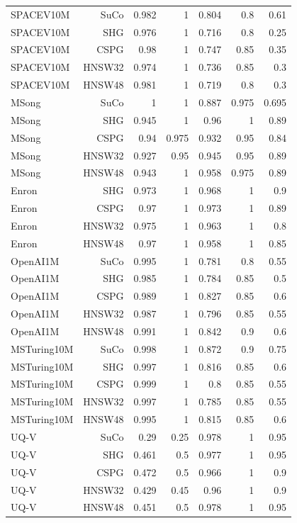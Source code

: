 \begin{table}[t]
\begin{tabular}{lrrrrrr}
SPACEV10M & SuCo & 0.982 & 1 & 0.804 & 0.8 & 0.61 \\
SPACEV10M & SHG & 0.976 & 1 & 0.716 & 0.8 & 0.25 \\
SPACEV10M & CSPG & 0.98 & 1 & 0.747 & 0.85 & 0.35 \\
SPACEV10M & HNSW32 & 0.974 & 1 & 0.736 & 0.85 & 0.3 \\
SPACEV10M & HNSW48 & 0.981 & 1 & 0.719 & 0.8 & 0.3 \\
MSong & SuCo & 1 & 1 & 0.887 & 0.975 & 0.695 \\
MSong & SHG & 0.945 & 1 & 0.96 & 1 & 0.89 \\
MSong & CSPG & 0.94 & 0.975 & 0.932 & 0.95 & 0.84 \\
MSong & HNSW32 & 0.927 & 0.95 & 0.945 & 0.95 & 0.89 \\
MSong & HNSW48 & 0.943 & 1 & 0.958 & 0.975 & 0.89 \\
Enron & SHG & 0.973 & 1 & 0.968 & 1 & 0.9 \\
Enron & CSPG & 0.97 & 1 & 0.973 & 1 & 0.89 \\
Enron & HNSW32 & 0.975 & 1 & 0.963 & 1 & 0.8 \\
Enron & HNSW48 & 0.97 & 1 & 0.958 & 1 & 0.85 \\
OpenAI1M & SuCo & 0.995 & 1 & 0.781 & 0.8 & 0.55 \\
OpenAI1M & SHG & 0.985 & 1 & 0.784 & 0.85 & 0.5 \\
OpenAI1M & CSPG & 0.989 & 1 & 0.827 & 0.85 & 0.6 \\
OpenAI1M & HNSW32 & 0.987 & 1 & 0.796 & 0.85 & 0.55 \\
OpenAI1M & HNSW48 & 0.991 & 1 & 0.842 & 0.9 & 0.6 \\
MSTuring10M & SuCo & 0.998 & 1 & 0.872 & 0.9 & 0.75 \\
MSTuring10M & SHG & 0.997 & 1 & 0.816 & 0.85 & 0.6 \\
MSTuring10M & CSPG & 0.999 & 1 & 0.8 & 0.85 & 0.55 \\
MSTuring10M & HNSW32 & 0.997 & 1 & 0.785 & 0.85 & 0.55 \\
MSTuring10M & HNSW48 & 0.995 & 1 & 0.815 & 0.85 & 0.6 \\
UQ-V & SuCo & 0.29 & 0.25 & 0.978 & 1 & 0.95 \\
UQ-V & SHG & 0.461 & 0.5 & 0.977 & 1 & 0.95 \\
UQ-V & CSPG & 0.472 & 0.5 & 0.966 & 1 & 0.9 \\
UQ-V & HNSW32 & 0.429 & 0.45 & 0.96 & 1 & 0.9 \\
UQ-V & HNSW48 & 0.451 & 0.5 & 0.978 & 1 & 0.95 \\
\bottomrule
\end{tabular}
\end{table}
